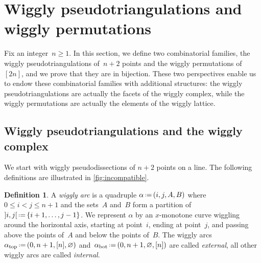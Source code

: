\documentclass{amsart}
\theoremstyle{definition}
\newtheorem{definition}[theorem]{Definition}
\newcommand{\eqdef}{\mbox{\,\raisebox{0.2ex}{\scriptsize\ensuremath{\mathrm:}}\ensuremath{=}\,}} %
\newcommand{\darkblue}{\color{darkblue}} %
\newcommand{\defn}[1]{\textsl{\darkblue #1}} %
\begin{document}

\newpage
\section{Wiggly pseudotriangulations and wiggly permutations}
\label{sec:combinatorics}

Fix an integer~$n \ge 1$.
In this section, we define two combinatorial families, the wiggly pseudotriangulations of~$n+2$ points and the wiggly permutations of~$[2n]$, and we prove that they are in bijection.
These two perspectives enable us to endow these combinatorial families with additional structures: the wiggly pseudotriangulations are actually the facets of the wiggly complex, while the wiggly permutations are actually the elements of the wiggly lattice.


\subsection{Wiggly pseudotriangulations and the wiggly complex}
\label{subsec:wigglyPseudotriangulations}

We start with wiggly pseudodissections of $n+2$ points on a line.
The following definitions are illustrated in \cref{fig:incompatible}.

\begin{definition}
A \defn{wiggly arc} is a quadruple $\alpha \eqdef (i,j,A,B)$ where $0 \le i < j \le n+1$ and the sets~$A$ and~$B$ form a partition of~${]i,j[} \eqdef \{i+1, \dots, j-1\}$.
We represent $\alpha$ by an $x$-monotone curve wiggling around the horizontal axis, starting at point~$i$, ending at point~$j$, and passing above the points of~$A$ and below the points of~$B$.
The wiggly arcs~$\alpha_\mathrm{top} \eqdef (0, n+1, [n], \varnothing)$ and~$\alpha_\mathrm{bot} \eqdef (0, n+1, \varnothing, [n])$ are called \defn{external}, all other wiggly arcs are called \defn{internal}.
\end{definition}
\end{document}
